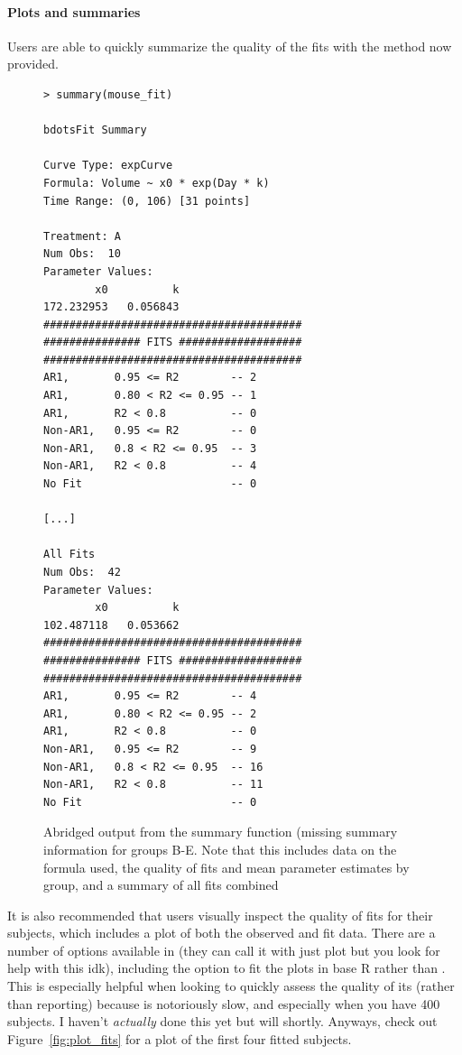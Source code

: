 \paragraph{Plots and summaries}

Users are able to quickly summarize the quality of the fits with the  method now provided. 

\begin{singlespace}
\begin{figure}[H]
\centering
\begin{BVerbatim}
> summary(mouse_fit)

bdotsFit Summary

Curve Type: expCurve 
Formula: Volume ~ x0 * exp(Day * k) 
Time Range: (0, 106) [31 points]

Treatment: A 
Num Obs:  10 
Parameter Values: 
        x0          k 
172.232953   0.056843 
########################################
############### FITS ###################
########################################
AR1,       0.95 <= R2        -- 2 
AR1,       0.80 < R2 <= 0.95 -- 1 
AR1,       R2 < 0.8          -- 0 
Non-AR1,   0.95 <= R2        -- 0 
Non-AR1,   0.8 < R2 <= 0.95  -- 3 
Non-AR1,   R2 < 0.8          -- 4 
No Fit                       -- 0 

[...]

All Fits 
Num Obs:  42 
Parameter Values: 
        x0          k 
102.487118   0.053662 
########################################
############### FITS ###################
########################################
AR1,       0.95 <= R2        -- 4 
AR1,       0.80 < R2 <= 0.95 -- 2 
AR1,       R2 < 0.8          -- 0 
Non-AR1,   0.95 <= R2        -- 9 
Non-AR1,   0.8 < R2 <= 0.95  -- 16 
Non-AR1,   R2 < 0.8          -- 11 
No Fit                       -- 0 
\end{BVerbatim}
\caption{Abridged output from the summary function (missing summary information for groups B-E. Note that this includes data on the formula used, the quality of fits and mean parameter estimates by group, and a summary of all fits combined}
\end{figure}
\end{singlespace}

It is also recommended that users visually inspect the quality of fits for their subjects, which includes a plot of both the observed and fit data. There are a number of options available in  (they can call it with just plot but you look for help with this idk), including the option to fit the plots in base R rather than . This is especially helpful when looking to quickly assess the quality of its (rather than reporting) because  is notoriously slow, and especially when you have 400 subjects. I haven't \textit{actually} done this yet but will shortly. Anyways, check out Figure~\ref{fig:plot_fits} for a plot of the first four fitted subjects.


